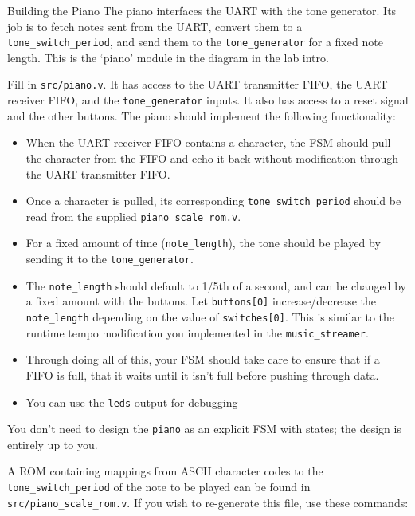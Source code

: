 \documentclass[11pt]{article}
\makeatletter
\renewcommand{\section}
{\@startsection {section}{1}{0pt}
 {-2ex}
 {1ex}
 {\bfseries\Large}}
\makeatother
\begin{document}
\section{Building the Piano}
The piano interfaces the UART with the tone generator.
Its job is to fetch notes sent from the UART, convert them to a \verb|tone_switch_period|, and send them to the \verb|tone_generator| for a fixed note length.
This is the `piano' module in the diagram in the lab intro.

Fill in \verb|src/piano.v|.
It has access to the UART transmitter FIFO, the UART receiver FIFO, and the \verb|tone_generator| inputs.
It also has access to a reset signal and the other buttons.
The piano should implement the following functionality:

\begin{itemize}
    \item When the UART receiver FIFO contains a character, the FSM should pull the character from the FIFO and echo it back without modification through the UART transmitter FIFO.

    \item Once a character is pulled, its corresponding \verb|tone_switch_period| should be read from the supplied \verb|piano_scale_rom.v|.

    \item For a fixed amount of time (\verb|note_length|), the tone should be played by sending it to the \verb|tone_generator|.

    \item The \verb|note_length| should default to 1/5th of a second, and can be changed by a fixed amount with the buttons.
      Let \verb|buttons[0]| increase/decrease the \verb|note_length| depending on the value of \verb|switches[0]|.
      This is similar to the runtime tempo modification you implemented in the \verb|music_streamer|.

    \item Through doing all of this, your FSM should take care to ensure that if a FIFO is full, that it waits until it isn't full before pushing through data.

    \item You can use the \verb|leds| output for debugging
\end{itemize}

You don't need to design the \verb|piano| as an explicit FSM with states; the design is entirely up to you.

A ROM containing mappings from ASCII character codes to the \verb|tone_switch_period| of the note to be played can be found in \verb|src/piano_scale_rom.v|.
If you wish to re-generate this file, use these commands:
\end{document}
